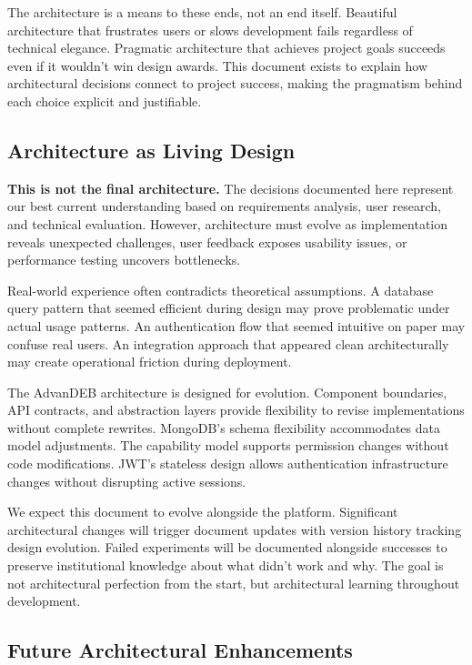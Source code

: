 \documentclass[12pt,a4paper]{article}
\begin{document}
The architecture is a means to these ends, not an end itself. Beautiful architecture that frustrates users or slows development fails regardless of technical elegance. Pragmatic architecture that achieves project goals succeeds even if it wouldn't win design awards. This document exists to explain how architectural decisions connect to project success, making the pragmatism behind each choice explicit and justifiable.

\subsection{Architecture as Living Design}

\textbf{This is not the final architecture.} The decisions documented here represent our best current understanding based on requirements analysis, user research, and technical evaluation. However, architecture must evolve as implementation reveals unexpected challenges, user feedback exposes usability issues, or performance testing uncovers bottlenecks.

Real-world experience often contradicts theoretical assumptions. A database query pattern that seemed efficient during design may prove problematic under actual usage patterns. An authentication flow that seemed intuitive on paper may confuse real users. An integration approach that appeared clean architecturally may create operational friction during deployment.

The AdvanDEB architecture is designed for evolution. Component boundaries, API contracts, and abstraction layers provide flexibility to revise implementations without complete rewrites. MongoDB's schema flexibility accommodates data model adjustments. The capability model supports permission changes without code modifications. JWT's stateless design allows authentication infrastructure changes without disrupting active sessions.

We expect this document to evolve alongside the platform. Significant architectural changes will trigger document updates with version history tracking design evolution. Failed experiments will be documented alongside successes to preserve institutional knowledge about what didn't work and why. The goal is not architectural perfection from the start, but architectural learning throughout development.

\subsection{Future Architectural Enhancements}
\end{document}
